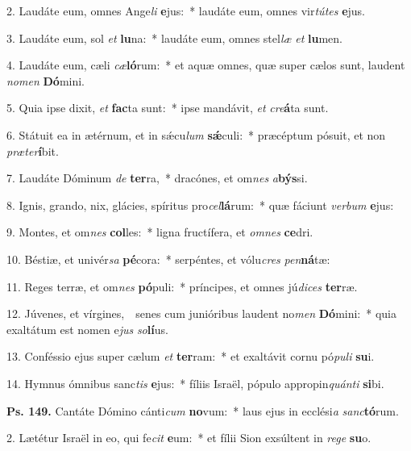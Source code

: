 
2. Laudáte eum, omnes Ange\textit{li} \textbf{e}jus:~* laudáte eum, omnes vir\textit{tú}\textit{tes} \textbf{e}jus.

3. Laudáte eum, sol \textit{et} \textbf{lu}na:~* laudáte eum, omnes stel\textit{læ} \textit{et} \textbf{lu}men.

4. Laudáte eum, cæli \textit{cæ}\textbf{ló}rum:~* et aquæ omnes, quæ super cælos sunt, laudent \textit{no}\textit{men} \textbf{Dó}mini.

5. Quia ipse dixit, \textit{et} \textbf{fac}ta sunt:~* ipse mandávit, \textit{et} \textit{cre}\textbf{á}ta sunt.

6. Státuit ea in ætérnum, et in s\'{\ae}cu\textit{lum} \textbf{s\'{\ae}}culi:~* præcéptum pósuit, et non \textit{præ}\textit{ter}\textbf{í}bit.

7. Laudáte Dóminum \textit{de} \textbf{ter}ra,~* dracónes, et om\textit{nes} \textit{a}\textbf{býs}si.

8. Ignis, grando, nix, glácies, spíritus pro\textit{cel}\textbf{lá}rum:~* quæ fáciunt \textit{ver}\textit{bum} \textbf{e}jus:

9. Montes, et om\textit{nes} \textbf{col}les:~* ligna fructífera, et \textit{om}\textit{nes} \textbf{ce}dri.

10. Béstiæ, et univér\textit{sa} \textbf{pé}cora:~* serpéntes, et vólu\textit{cres} \textit{pen}\textbf{ná}tæ:

11. Reges terræ, et om\textit{nes} \textbf{pó}puli:~* príncipes, et omnes jú\textit{di}\textit{ces} \textbf{ter}ræ.

12. Júvenes, et vírgines,~\GreDagger\ senes cum junióribus laudent no\textit{men} \textbf{Dó}mini:~* quia exaltátum est nomen e\textit{jus} \textit{so}\textbf{lí}us.

13. Conféssio ejus super cælum \textit{et} \textbf{ter}ram:~* et exaltávit cornu pó\textit{pu}\textit{li} \textbf{su}i.

14. Hymnus ómnibus sanc\textit{tis} \textbf{e}jus:~* fíliis Israël, pópulo appropin\textit{quán}\textit{ti} \textbf{si}bi.

\textbf{Ps. 149.} Cantáte Dómino cánti\textit{cum} \textbf{no}vum:~* laus ejus in ecclési\textit{a} \textit{sanc}\textbf{tó}rum.

2. Lætétur Israël in eo, qui fe\textit{cit} \textbf{e}um:~* et fílii Sion exsúltent in \textit{re}\textit{ge} \textbf{su}o.

